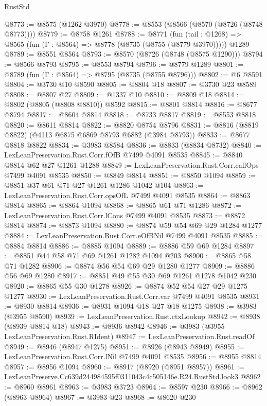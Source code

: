 \begin{lexlean}{RustStd}
\begin{coremodule}
@8773 := @8575 (@1262 @3970)
@8778 := @8553 (@8566 (@8570 (@8726 (@8748 @8773))))
@8779 := @8758 @1261
@8788 := @8771
    (fun (tail : @1268) => @8565 (fun (Γ : @8564) => @8778 (@8735 (@8755 (@8779 @3970)))))
    @1289
@8789 := @8551 @8564
@8793 := @8570 (@8726 (@8748 (@8575 @1290)))
@8794 := @8566 @8793
@8795 := @8553 @8794
@8796 := @8779 @1289
@8801 := @8789 (fun (Γ : @8564) => @8795 (@8735 (@8755 @8796)))
@8802 := @6 @8591
@8804 := @3730 @10 @8590
@8805 := @8804 @18
@8807 := @3730 @23 @8589
@8808 := @8807 @27
@8809 := @1337 @10
@8810 := @8809 @18
@8814 := @8802 (@8805 (@8808 @8810)) @8592
@8815 := @8801 @8814
@8816 := @8677 @8794
@8817 := @8604 @8814
@8818 := @8733 @8817
@8819 := @8553 @8818
@8820 := @8611 @8814
@8822 := @8820 @8754 @8796
@8831 := @8816 (@8819 @8822) (@4113 @6875 @6869 @8793 @6882 (@3984 @8793))
@8833 := @8677 @8818 @8822
@8834 := @3983 @8584
@8836 := @8833 (@8834 @8732)
@8840 := LexLeanPreservation.Rust.Corr.fOfB @7499 @4091 @8535
@8845 := @8840 @8814 @62 @27 @1261 @1288
@8849 := LexLeanPreservation.Rust.Corr.callOps @7499 @4091 @8535
@8850 := @8849 @8814
@8851 := @8850 @1094
@8859 := @8851 @37 @61 @71 @27 @1261 @1286 @1042 @104
@8863 := LexLeanPreservation.Rust.Corr.opsOfL @7499 @4091 @8535
@8864 := @8863 @8814
@8865 := @8864 @1094
@8868 := @8865 @61 @71 @1286
@8872 := LexLeanPreservation.Rust.Corr.lCons @7499 @4091 @8535
@8873 := @8872 @8814
@8874 := @8873 @1094
@8880 := @8874 @59 @54 @69 @29 @1284 @1277
@8884 := LexLeanPreservation.Rust.Corr.eOfBNil @7499 @4091 @8535
@8885 := @8884 @8814
@8886 := @8885 @1094
@8889 := @8886 @59 @69 @1284
@8897 := @8851 @44 @58 @71 @69 @1261 @1282 @1094 @203
@8900 := @8865 @58 @71 @1282
@8906 := @8874 @56 @54 @69 @29 @1280 @1277
@8909 := @8886 @56 @69 @1280
@8917 := @8851 @49 @55 @30 @69 @1261 @1278 @1042 @230
@8920 := @8865 @55 @30 @1278
@8926 := @8874 @52 @54 @27 @29 @1275 @1277
@8930 := LexLeanPreservation.Rust.Corr.var @7499 @4091 @8535
@8931 := @8930 @8814
@8936 := @8931 @1094 @18 @27 @18 @1275
@8938 := @3983 (@3955 @8590)
@8939 := LexLeanPreservation.Rust.ctxLookup
@8942 := @8938 (@8939 @8814 @18)
@8943 := @8936 @8942
@8946 := @3983 (@3955 LexLeanPreservation.Rust.RIdent)
@8947 := LexLeanPreservation.Rust.readOf
@8949 := @8946 (@8947 @1275)
@8951 := @8926 (@8943 @8949)
@8955 := LexLeanPreservation.Rust.Corr.lNil @7499 @4091 @8535
@8956 := @8955 @8814
@8957 := @8956 @1094
@8960 := @8917 (@8920 (@8951 @8957))
@8961 := LexLeanPreserve.Cc639d244984595f0311043c4c505146e.R24.RustStd.look3
@8962 := @8960 @8961
@8963 := @3983 @3723
@8964 := @8597 @230
@8966 := @8962 (@8963 @8964)
@8967 := @3983 @23
@8968 := @8620 @230

\end{coremodule}
\end{lexlean}
